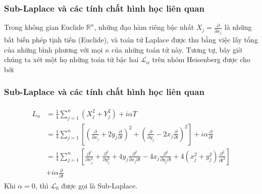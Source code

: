 \documentclass[11pt]{beamer}
\numberwithin{equation}{section}
\theoremstyle{plain}
\theoremstyle{definition}
\theoremstyle{remark}
\begin{document}
\begin{frame}\frametitle{Sub-Laplace và các tính chất hình học liên quan}
Trong không gian Euclide $\mathbb{R}^n$, những đạo hàm riêng bậc nhất ${X_j} = \frac{\partial }{{\partial {x_j}}}$ là những bất biến phép tịnh tiến (Euclide), và toán tử Laplace được thu bằng việc lấy tổng của những bình phương với mọi $n$ của những toán tử này. Tương tự, bây giờ chúng ta xét một họ những toán tử bậc hai $\mathcal{L}_{\alpha}$ trên nhóm Heisenberg được cho bởi
\end{frame}

\begin{frame}\frametitle{Sub-Laplace và các tính chất hình học liên quan}
\begin{eqnarray*}
\begin{split}
{L_\alpha } &= \frac{1}{4}\sum\limits_{j = 1}^n {\left( {X_j^2 + Y_j^2} \right)}  + i\alpha T\\
 &= \frac{1}{4}\sum\limits_{j = 1}^n {\left[ {{{\left( {\frac{\partial }{{\partial {x_j}}} + 2{y_j}\frac{\partial }{{\partial t}}} \right)}^2} + {{\left( {\frac{\partial }{{\partial {y_j}}} - 2{x_j}\frac{\partial }{{\partial t}}} \right)}^2}} \right]}  + i\alpha \frac{\partial }{{\partial t}}\\
 &= \frac{1}{4}\sum\limits_{j = 1}^n {\left[ {\frac{{{\partial ^2}}}{{\partial x_j^2}} + \frac{{{\partial ^2}}}{{\partial y_j^2}} + 4{y_j}\frac{{{\partial ^2}}}{{\partial {x_j}\partial t}} - 4{x_j}\frac{{{\partial ^2}}}{{\partial {y_j}\partial t}} + 4\left( {x_j^2 + y_j^2} \right)\frac{{{\partial ^2}}}{{\partial {t^2}}}} \right]} \\
 &+ i\alpha \frac{\partial }{{\partial t}}
\end{split}
\end{eqnarray*}
Khi $\alpha=0$, thì $\mathcal{L}_{0}$ được gọi là Sub-Laplace. 
\end{frame}
\end{document}
